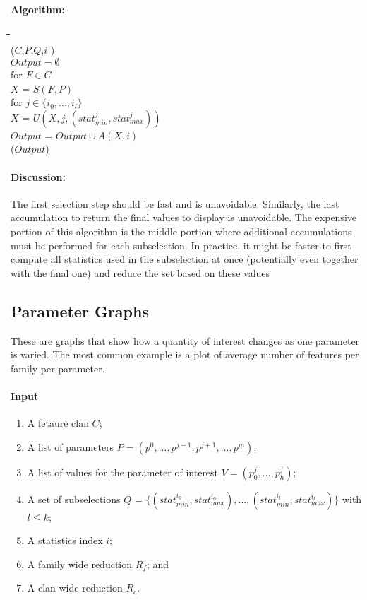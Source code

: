 \documentclass[journal]{vgtc}         %
\begin{document}
\paragraph{Algorithm:}
\begin{tabbing}
\=\hspace{0.2in}\=\hspace{0.2in}\=\hspace{0.2in}\=\hspace{0.2in}\=\\
($C$,$P$,$Q$,$i$ ) \\
\>\>$Output = \emptyset$\\
\>\>for $F \in C$\\
\>\>\>$X$ = $S(F,P)$\\
\>\>\>for $j \in \{i_0,...,i_l\}$\\
\>\>\>\>$X$ = $U(X,j,(stat_{min}^{j},stat_{max}^{j}))$\\
\>\>\>$Output$ = $Output \cup A(X,i)$\\ 
\>($Output$)
\end{tabbing}


\paragraph{Discussion:}

The first selection step should be fast and is unavoidable. Similarly, the last
accumulation to return the final values to display is unavoidable. The expensive
portion of this algorithm is the middle portion where additional accumulations
must be performed for each subselection. In practice, it might be faster to
first compute all statistics used in the subselection at once (potentially even
together with the final one) and reduce the set based on these values


\subsection{Parameter Graphs}

These are graphs that show how a quantity of interest changes as one parameter
is varied. The most common example is a plot of average number of features per
family per parameter.

\paragraph{Input}
\begin{enumerate}
\item A fetaure clan $C$;
\item A list of parameters $P = (p^0,...,p^{j-1},p^{j+1},...,p^m)$; 
\item A list of values for the parameter of interest $V = (p^j_0,...,p^j_h)$;
\item A set of subselections $Q$ = $\{(stat_{min}^{i_0},stat_{max}^{i_0}), ... ,
  (stat_{min}^{i_l},stat_{max}^{i_l})\}$ with $l \le k$; 
\item A statistics index $i$;
\item A family wide reduction $R_f$; and
\item A clan wide reduction $R_c$.
\end{enumerate}
\end{document}
